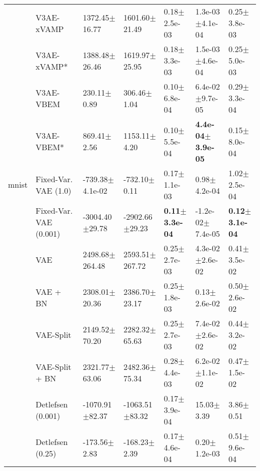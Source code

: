 \begin{tabular}{lllllll}
      & V3AE-xVAMP &            1372.45$\pm$16.77 &            1601.60$\pm$21.49 &              0.18$\pm$2.5e-03 &            1.3e-03$\pm$4.1e-04 &              0.25$\pm$3.8e-03 \\
      & V3AE-xVAMP* &            1388.48$\pm$26.46 &            1619.97$\pm$25.95 &              0.18$\pm$3.3e-03 &            1.5e-03$\pm$4.6e-04 &              0.25$\pm$5.0e-03 \\
      & V3AE-VBEM &              230.11$\pm$0.89 &              306.46$\pm$1.04 &              0.10$\pm$6.8e-04 &            6.4e-02$\pm$9.7e-05 &              0.29$\pm$3.3e-04 \\
      & V3AE-VBEM* &              869.41$\pm$2.56 &             1153.11$\pm$4.20 &              0.10$\pm$5.5e-04 &   \textbf{4.4e-04$\pm$3.9e-05} &              0.15$\pm$8.0e-04 \\
mnist & Fixed-Var. VAE (1.0) &          -739.38$\pm$4.1e-02 &             -732.10$\pm$0.11 &              0.17$\pm$1.1e-03 &               0.98$\pm$4.2e-04 &              1.02$\pm$2.5e-04 \\
      & Fixed-Var. VAE (0.001) &           -3004.40$\pm$29.78 &           -2902.66$\pm$29.23 &     \textbf{0.11$\pm$3.3e-04} &           -1.2e-02$\pm$7.4e-05 &     \textbf{0.12$\pm$3.1e-04} \\
      & VAE &           2498.68$\pm$264.48 &           2593.51$\pm$267.72 &              0.25$\pm$2.7e-03 &            4.3e-02$\pm$2.6e-02 &              0.41$\pm$3.5e-02 \\
      & VAE + BN &            2308.01$\pm$20.36 &            2386.70$\pm$23.17 &              0.25$\pm$1.8e-03 &               0.13$\pm$2.6e-02 &              0.50$\pm$2.6e-02 \\
      & VAE-Split &            2149.52$\pm$70.20 &            2282.32$\pm$65.63 &              0.25$\pm$2.7e-03 &            7.4e-02$\pm$2.6e-02 &              0.44$\pm$3.2e-02 \\
      & VAE-Split + BN &            2321.77$\pm$63.06 &            2482.36$\pm$75.34 &              0.28$\pm$4.4e-03 &            6.2e-02$\pm$1.1e-02 &              0.47$\pm$1.5e-02 \\
      & Detlefsen (0.001) &           -1070.91$\pm$82.37 &           -1063.51$\pm$83.32 &              0.17$\pm$3.9e-04 &                 15.03$\pm$3.39 &                 3.86$\pm$0.51 \\
      & Detlefsen (0.25) &             -173.56$\pm$2.83 &             -168.23$\pm$2.39 &              0.17$\pm$4.6e-04 &               0.20$\pm$1.2e-03 &              0.51$\pm$9.6e-04 \\

\end{tabular}
